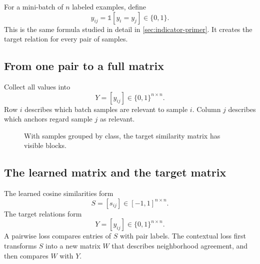 \documentclass[11pt,oneside,openany]{book}
\theoremstyle{myplain}
\theoremstyle{definition}
\newcommand{\ind}{\mathds{1}}
\begin{document}
For a mini-batch of $n$ labeled examples, define
\begin{equation}
  y_{ij}=\ind[y_i=y_j]\in\{0,1\}.
  \label{eq:labelsim}
\end{equation}
This is the same formula studied in detail in \cref{sec:indicator-primer}. It creates the target relation for every pair of samples.

\subsection{From one pair to a full matrix}

Collect all values into
\[
  Y=[y_{ij}]\in\{0,1\}^{n\times n}.
\]
Row $i$ describes which batch samples are relevant to sample $i$. Column $j$ describes which anchors regard sample $j$ as relevant.

\begin{figure}[H]
\centering
{}
\caption{With samples grouped by class, the target similarity matrix has visible blocks.}
\label{fig:label-matrix}
\end{figure}

\subsection{The learned matrix and the target matrix}

The learned cosine similarities form
\[
  S=[s_{ij}]\in[-1,1]^{n\times n}.
\]
The target relations form
\[
  Y=[y_{ij}]\in\{0,1\}^{n\times n}.
\]
A pairwise loss compares entries of $S$ with pair labels. The contextual loss first transforms $S$ into a new matrix $W$ that describes neighborhood agreement, and then compares $W$ with $Y$.
\end{document}
